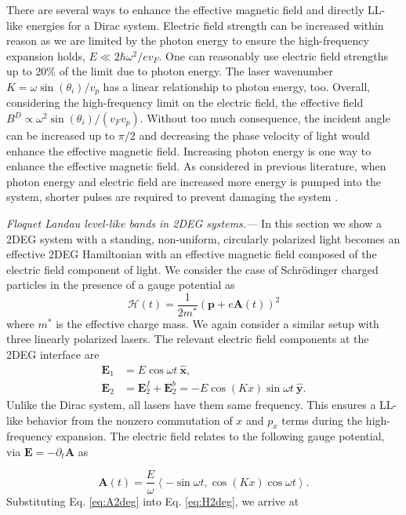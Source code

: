 \documentclass[aps,prb,twocolumn,showpacs,superscriptaddress]{revtex4-2}
\let\oldhat\hat
\renewcommand{\hat}[1]{\oldhat{\mathbf{#1}}}
\renewcommand{\vec}[1]{\mathbf{#1}}
\newcommand{\ham}{\mathcal{H}}
\begin{document}
There are several ways to enhance the effective magnetic field and directly LL-like energies for a Dirac system.
Electric field strength can be increased within reason as we are limited by the photon energy to ensure the high-frequency expansion holds, $E \ll 2\hbar\omega^2/e v_F$.
One can reasonably use electric field strengths up to 20\% of the limit due to photon energy.
The laser wavenumber $K= \omega \sin{(\theta_i)} / v_p$ has a linear relationship to photon energy, too.
Overall, considering the high-frequency limit on the electric field, the effective field $B^D \propto \omega^2 \sin{(\theta_i)} / (v_F v_p)$.
Without too much consequence, the incident angle can be increased up to $\pi/2$ and decreasing the phase velocity of light would enhance the effective magnetic field.
Increasing photon energy is one way to enhance the effective magnetic field.
As considered in previous literature, when photon energy and electric field are increased more energy is pumped into the system, shorter pulses are required to prevent damaging the system \cite{YHW, JWM}.

\emph{Floquet Landau level-like bands in 2DEG systems.---} In this section we show a 2DEG system with a standing, non-uniform, circularly polarized light becomes an effective 2DEG Hamiltonian with an effective magnetic field composed of the electric field component of light.
We consider the case of Schr\"{o}dinger charged particles in the presence of a gauge potential as
\begin{equation}\label{eq:H2deg}
  \ham(t) = \dfrac{1}{2m^*} \left( \vec{p} + e \vec{A}(t)\right)^2
\end{equation}
where $m^*$ is the effective charge mass.
We again consider a similar setup with three linearly polarized lasers.
The relevant electric field components at the 2DEG interface are
\begin{align} \label{eq:E2field}
  \vec{E}_{1} &= E \cos{\omega t}\ \hat{x}, \nonumber \\
  \vec{E}_{2} &= \vec{E}_2^f + \vec{E}_2^b = -E\cos{(K x)} \sin{\omega t}\ \hat{y}.
\end{align}%
Unlike the Dirac system, all lasers have them same frequency.
This ensures a LL-like behavior from the nonzero commutation of $x$ and $p_x$ terms during the high-frequency expansion.
The electric field relates to the following gauge potential, via $\vec{E} = -\partial_t \vec{A}$ as

\begin{equation}\label{eq:A2deg}
  \vec{A}(t)= \dfrac{E}{\omega} \left\langle -\sin \omega t, \cos{(Kx)} \cos{\omega t} \right\rangle.
\end{equation}%
Substituting Eq. \eqref{eq:A2deg} into Eq. \eqref{eq:H2deg}, we arrive at
\end{document}
